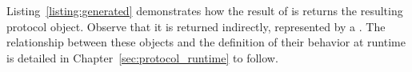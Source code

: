Listing~\ref{listing:generated} demonstrates how the result of  is returns the resulting protocol object. Observe that it is returned indirectly, represented by a . The relationship between these objects and the definition of their behavior at runtime is detailed in Chapter~\ref{sec:protocol_runtime} to follow.
%
%
%
%
%
%
%
